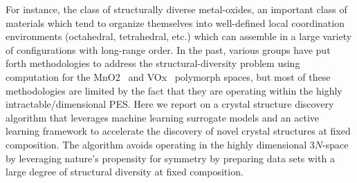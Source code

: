 %
For instance, the class of structurally diverse metal-oxides, an important class of materials which tend to organize themselves into well-defined local coordination environments (octahedral, tetrahedral, etc.) which can assemble in a large variety of configurations with long-range order.
In the past, various groups have put forth methodologies to address the structural-diversity problem using computation for the MnO2~\cite{} and VOx~\cite{} polymorph spaces,
but most of these methodologies are limited by the fact that they are operating within the highly intractable/dimensional PES.
Here we report on a crystal structure discovery algorithm that leverages machine learning surrogate models and an active learning framework to accelerate the discovery of novel crystal structures at fixed composition.
The algorithm avoids operating in the highly dimensional $3N$-space by leveraging nature's propensity for symmetry by preparing data sets with a large degree of structural diversity at fixed composition.

%

